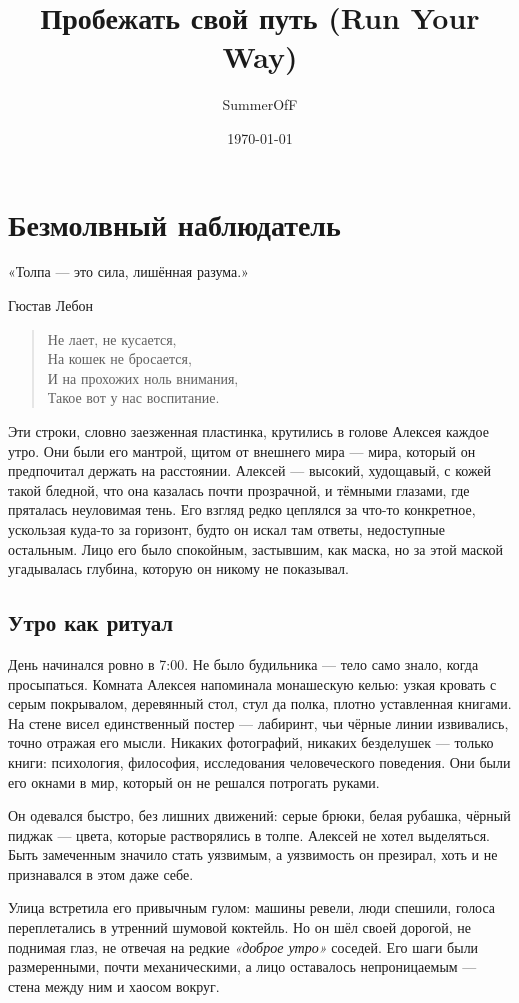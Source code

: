 \documentclass[12pt,a4paper]{book}
\title{Пробежать свой путь (Run Your Way)}
\author{SummerOfF}
\date{\today}
\begin{document}
\maketitle
\tableofcontents

\chapter{Безмолвный наблюдатель}
\epigraph{«Толпа --- это сила, лишённая разума.»}{Гюстав Лебон}
\begin{verse}
Не лает, не кусается,\\
На кошек не бросается,\\
И на прохожих ноль внимания,\\
Такое вот у нас воспитание.
\end{verse}

Эти строки, словно заезженная пластинка, крутились в голове Алексея каждое утро. Они были его мантрой, щитом от внешнего мира --- мира, который он предпочитал держать на расстоянии. Алексей --- высокий, худощавый, с кожей такой бледной, что она казалась почти прозрачной, и тёмными глазами, где пряталась неуловимая тень. Его взгляд редко цеплялся за что-то конкретное, ускользая куда-то за горизонт, будто он искал там ответы, недоступные остальным. Лицо его было спокойным, застывшим, как маска, но за этой маской угадывалась глубина, которую он никому не показывал.

\section{Утро как ритуал}

День начинался ровно в 7:00. Не было будильника --- тело само знало, когда просыпаться. Комната Алексея напоминала монашескую келью: узкая кровать с серым покрывалом, деревянный стол, стул да полка, плотно уставленная книгами. На стене висел единственный постер --- лабиринт, чьи чёрные линии извивались, точно отражая его мысли. Никаких фотографий, никаких безделушек --- только книги: психология, философия, исследования человеческого поведения. Они были его окнами в мир, который он не решался потрогать руками.

Он одевался быстро, без лишних движений: серые брюки, белая рубашка, чёрный пиджак --- цвета, которые растворялись в толпе. Алексей не хотел выделяться. Быть замеченным значило стать уязвимым, а уязвимость он презирал, хоть и не признавался в этом даже себе.

Улица встретила его привычным гулом: машины ревели, люди спешили, голоса переплетались в утренний шумовой коктейль. Но он шёл своей дорогой, не поднимая глаз, не отвечая на редкие \textit{«доброе утро»} соседей. Его шаги были размеренными, почти механическими, а лицо оставалось непроницаемым --- стена между ним и хаосом вокруг.
\end{document}
